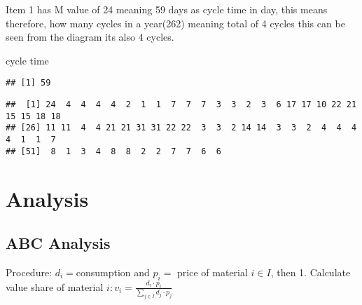 \documentclass[
]{article}
\newenvironment{Shaded}{\begin{snugshade}}{\end{snugshade}}
\newcommand{\CommentTok}[1]{\textcolor[rgb]{0.56,0.35,0.01}{\textit{#1}}}
\newcommand{\DecValTok}[1]{\textcolor[rgb]{0.00,0.00,0.81}{#1}}
\newcommand{\KeywordTok}[1]{\textcolor[rgb]{0.13,0.29,0.53}{\textbf{#1}}}
\newcommand{\NormalTok}[1]{#1}
\newcommand{\OperatorTok}[1]{\textcolor[rgb]{0.81,0.36,0.00}{\textbf{#1}}}
\newcommand{\StringTok}[1]{\textcolor[rgb]{0.31,0.60,0.02}{#1}}
\begin{document}
Item 1 has M value of 24 meaning 59 days as cycle time in day, this
means therefore, how many cycles in a year(262) meaning total of 4
cycles this can be seen from the diagram its also 4 cycles.

cycle time

\begin{Shaded}
\end{Shaded}

\begin{verbatim}
## [1] 59
\end{verbatim}

\begin{Shaded}
\end{Shaded}

\begin{verbatim}
##  [1] 24  4  4  4  4  2  1  1  7  7  7  3  3  2  3  6 17 17 10 22 21 15 15 18 18
## [26] 11 11  4  4 21 21 31 31 22 22  3  3  2 14 14  3  3  2  4  4  4  4  1  1  7
## [51]  8  1  3  4  8  8  2  2  7  7  6  6
\end{verbatim}

\hypertarget{analysis}{%
\section{Analysis}\label{analysis}}

\hypertarget{abc-analysis}{%
\subsection{ABC Analysis}\label{abc-analysis}}

Procedure: \(d_i=\)consumption and \(p_i=\) price of material
\(i \in I\), then 1. Calculate value share of material
\(i:v_i=\frac {d_i\cdot p_i}{\sum_{j\in I}d_j \cdot p_j}\)

\begin{Shaded}
\end{Shaded}
\end{document}
